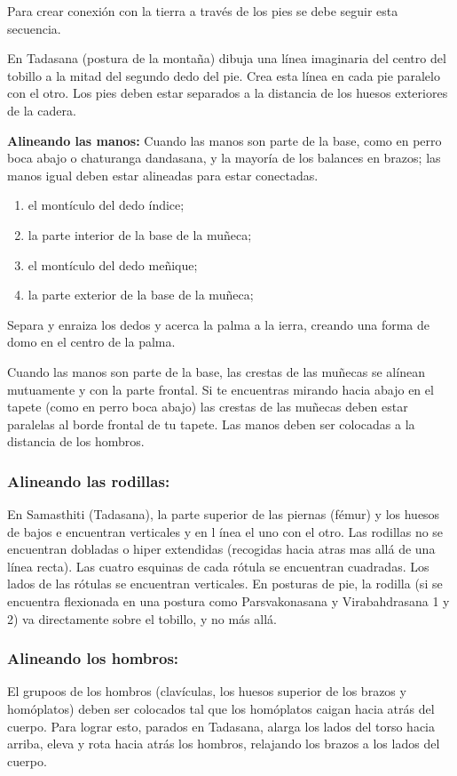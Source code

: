 Para crear conexión con la tierra a través de los pies se debe seguir esta secuencia.

En Tadasana (postura de la montaña) dibuja una línea imaginaria del centro del tobillo a la mitad del segundo dedo del pie. Crea esta línea en cada pie paralelo con el otro. Los pies deben estar separados a la distancia de los huesos exteriores de la cadera.

\textbf{Alineando las manos:}
Cuando las manos son parte de la base, como en perro boca abajo o chaturanga dandasana, y la mayoría de los balances en brazos; las manos igual deben estar alineadas para estar conectadas.
\begin{enumerate}
	\item el montículo del dedo índice;
	\item la parte interior de la base de la muñeca;
	\item el montículo del dedo meñique;
	\item la parte exterior de la base de la muñeca;
\end{enumerate}

Separa y enraiza los dedos y acerca la palma a la ierra, creando una forma de domo en el centro de la palma.

Cuando las manos son parte de la base, las crestas de las muñecas se alínean mutuamente y con la parte frontal. Si te encuentras mirando hacia abajo en el tapete (como en perro boca abajo) las crestas de las muñecas deben estar paralelas al borde frontal de tu tapete. Las manos deben ser colocadas a la distancia de los hombros.

\subsubsection{Alineando las rodillas:}
En Samasthiti (Tadasana), la parte superior de las piernas (fémur) y los huesos de bajos e encuentran verticales y en l ínea el uno con el otro. Las rodillas no se encuentran dobladas o hiper extendidas (recogidas hacia atras mas allá de una línea recta). Las cuatro esquinas de cada rótula se encuentran cuadradas. Los lados de las rótulas se encuentran verticales. En posturas de pie, la rodilla (si se encuentra flexionada en una postura como Parsvakonasana y Virabahdrasana 1 y 2) va directamente sobre el tobillo, y no más allá.

\subsubsection{Alineando los hombros:}
El grupoos de los hombros (clavículas, los huesos superior de los brazos y homóplatos) deben ser colocados tal que los homóplatos caigan hacia atrás del cuerpo. Para lograr esto, parados en Tadasana, alarga los lados del torso hacia arriba, eleva y rota hacia atrás los hombros, relajando los brazos a los lados del cuerpo.

